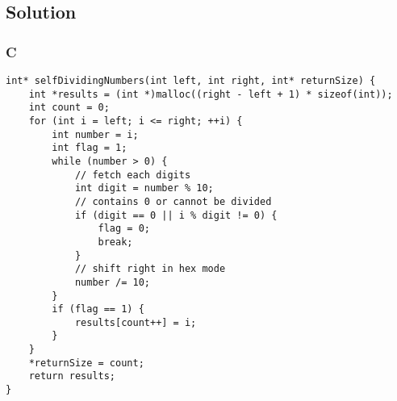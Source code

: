 \subsection*{Solution}
\subsubsection{C}
\begin{verbatim}
int* selfDividingNumbers(int left, int right, int* returnSize) {
    int *results = (int *)malloc((right - left + 1) * sizeof(int));
    int count = 0;
    for (int i = left; i <= right; ++i) {
        int number = i;
        int flag = 1;
        while (number > 0) {
            // fetch each digits
            int digit = number % 10;
            // contains 0 or cannot be divided
            if (digit == 0 || i % digit != 0) {
                flag = 0;
                break;
            }
            // shift right in hex mode
            number /= 10;
        }
        if (flag == 1) {
            results[count++] = i;
        }
    }
    *returnSize = count;
    return results;
}
\end{verbatim}

\newpage

